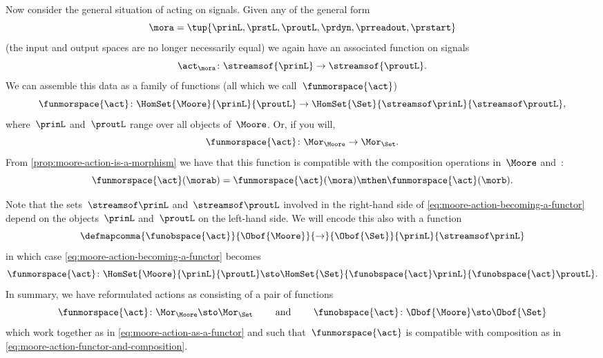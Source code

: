 Now consider the general situation of  acting on signals.
Given any  of the general form
\begin{equation}
    \mora = \tup{\prinL,\prstL,\proutL,\prdyn,\prreadout,\prstart}
\end{equation}
(the input and output spaces are no longer necessarily equal) we again have an associated function on signals
\begin{equation}
    \act_{\mora} \colon \streamsof{\prinL} \to \streamsof {\proutL}.
\end{equation}
We can assemble this data as a family of functions (all which we call~$\funmorspace{\act}$)
\begin{equation}
    \label{eq:moore-action-becoming-a-functor}
    \funmorspace{\act} \colon \HomSet{\Moore}{\prinL}{\proutL} \to \HomSet{\Set}{\streamsof\prinL}{\streamsof\proutL},
\end{equation}
where~$\prinL$ and~$\proutL$ range over all objects of~$\Moore$.
Or, if you will,
\begin{equation}
    \funmorspace{\act} \colon \Mor_\Moore \to \Mor_\Set.
\end{equation}
From \cref{prop:moore-action-is-a-morphism} we have that this function is compatible with the composition operations in~$\Moore$ and~\Set:
\begin{equation}
    \label{eq:moore-action-functor-and-composition}
    \funmorspace{\act}(\morab) = \funmorspace{\act}(\mora) \mthen \funmorspace{\act}(\morb).
\end{equation}

Note that the sets~$\streamsof\prinL$ and~$\streamsof\proutL$ involved in the right-hand side of \cref{eq:moore-action-becoming-a-functor} depend on the objects~$\prinL$ and~$\proutL$ on the left-hand side.
We will encode this also with a function
\begin{equation}
    \defmapcomma{\funobspace{\act}}
    {\Obof{\Moore}}
    {\to}
    {\Obof{\Set}}
    {\prinL}
    {\streamsof\prinL}
\end{equation}
in which case \cref{eq:moore-action-becoming-a-functor} becomes
\begin{equation}
    \label{eq:moore-action-as-a-functor}
    \funmorspace{\act} \colon \HomSet{\Moore}{\prinL}{\proutL} \sto \HomSet{\Set}{ \funobspace{\act}\prinL}{\funobspace{\act}\proutL}.
\end{equation}
%
In summary, we have reformulated  actions as consisting of a pair of functions
\begin{equation}
    \funmorspace{\act} \colon \Mor_\Moore \sto \Mor_\Set \qquad \text{ and } \qquad \funobspace{\act} \colon \Obof{\Moore} \sto \Obof{\Set}
\end{equation}
which work together as in \cref{eq:moore-action-as-a-functor} and such that~$\funmorspace{\act}$ is compatible with composition as in \cref{eq:moore-action-functor-and-composition}.

